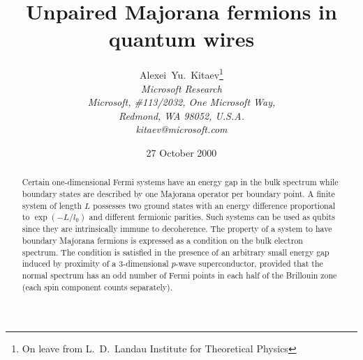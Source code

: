 
\renewcommand{\pmod}[1]{\ ({\bmod}\ #1)}
\newcommand{\bra}[1]{\langle #1|}
\newcommand{\ket}[1]{|#1\rangle}
\newcommand{\Pf}{\mathop{\rm Pf}\nolimits}
\newcommand{\sgn}{\mathop{\rm sgn}\nolimits}
\newcommand{\calM}{{\cal M}}

\newcommand{\lesssim}{\mathrel{\mathop{\mathchoice%
{\normalsize\raisebox{0.3ex}[1.1ex][-0.6ex]{$<$}}%
{\normalsize\raisebox{0.3ex}[1.1ex][-0.6ex]{$<$}}%
{\scriptsize\raisebox{0.3ex}[1.0ex][-0.8ex]{$<$}}%
{\scriptsize\raisebox{0.3ex}[1.0ex][-0.8ex]{$<$}}}%
\limits_\sim}}

\newenvironment{subfig}[1]%
{\def\subfigLabel{#1}\begin{tabular}[b]{@{}c@{}}}%
{\\[10pt]\subfigLabel\end{tabular}}

\newsavebox{\TempBox}
\newlength{\TempLength}


\title{Unpaired Majorana fermions in quantum wires}
\author{Alexei~Yu.~Kitaev\thanks{On leave from  L.~D.~Landau Institute
for Theoretical Physics}\\
{\it Microsoft Research}\\
{\it Microsoft, \#113/2032, One Microsoft Way,}\\
{\it Redmond, WA 98052, U.S.A.}\\
{\it kitaev@microsoft.com}
}
\date{27 October 2000}





\maketitle

\begin{abstract}
Certain one-dimensional Fermi systems have an energy gap in the bulk spectrum
while boundary states are described by one Majorana operator per boundary
point. A finite system of length $L$ possesses two ground states with an
energy difference proportional to $\exp(-L/l_0)$ and different fermionic
parities. Such systems can be used as qubits since they are intrinsically
immune to decoherence. The property of a system to have boundary Majorana
fermions is expressed as a condition on the bulk electron spectrum. The
condition is satisfied in the presence of an arbitrary small energy gap
induced by proximity of a 3-dimensional $p$-wave superconductor, provided that
the normal spectrum has an odd number of Fermi points in each half of the
Brillouin zone (each spin component counts separately).
\end{abstract}

